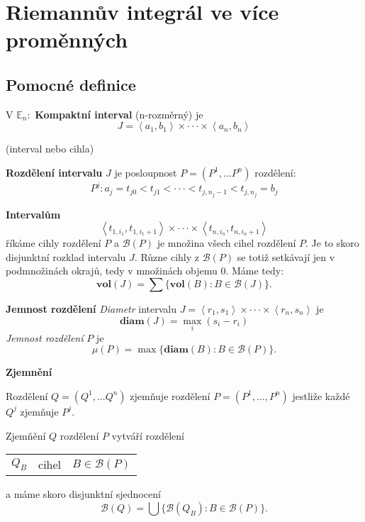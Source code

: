 \documentclass[../main.tex]{subfiles}
\begin{document}
\section{Riemannův integrál ve více proměnných}
\subsection{Pomocné definice}
\hspace{1.2mm}
V $\mathbb{E}_n:$ \textbf{Kompaktní interval} (n-rozměrný) je 
\[J = \left<a_1,b_1\right> \times \cdot \cdot \cdot \times \left<a_n,b_n\right>\]
\begin{center}
(interval nebo cihla)
\end{center}
\hspace{1.2mm}
\textbf{Rozdělení intervalu} $J$ je posloupnost $P = (P^1,...P^n)$ rozdělení:
\[P^j : a_j = t_{j0} < t_{j1} < \cdot \cdot \cdot < t_{j,n_j-1} < t_{j,n_j} = b_j\]

\noindent
\hspace{1.2mm}
\textbf{Intervalům}
\[\left<t_{1,i_1},t_{1,i_1+1}\right> \times \cdot \cdot \cdot \times \left<t_{n,i_n},t_{n,i_n+1}\right>\]
říkáme cihly rozdělení $P$ a $\mathcal{B}(P)$ je množina všech cihel rozdělení $P$. Je to skoro disjunktní rozklad intervalu $J$.
Různe cihly z $\mathcal{B}(P)$ se totiž setkávají jen v podmnožinách okrajů, tedy v množinách objemu 0. Máme tedy:
\[\textbf{vol}(J) = \sum \{\textbf{vol}(B) : B \in \mathcal{B}(J)\}.\]

\textbf{Jemnost rozdělení}
\textit{Diametr} intervalu $J = \left<r_1,s_1\right> \times \cdot \cdot \cdot \times \left<r_n,s_n\right>$ je 
\[\textbf{diam}(J) = \max_i (s_i - r_i)\]
\textit{Jemnost rozdělení} $P$ je 
\[\mu(P) = \max \{\textbf{diam}(B) : B \in \mathcal{B}(P)\}.\]

\textbf{Zjemnění}

Rozdělení $Q = (Q^1,...Q^n) $ zjemňuje rozdělení $P = (P^1,...,P^n)$ jestliže každé $Q^j$ zjemňuje $P^j$.

Zjemňění $Q$ rozdělení $P$ vytváří rozdělení
\begin{tabular}{c c c}
     $Q_B$ & cihel & $B \in \mathcal{B}(P)$  
\end{tabular}
a máme skoro disjunktní sjednocení 
\[\mathcal{B}(Q) = \bigcup \{\mathcal{B}(Q_B) : B \in \mathcal{B}(P)\}.\]
\end{document}
